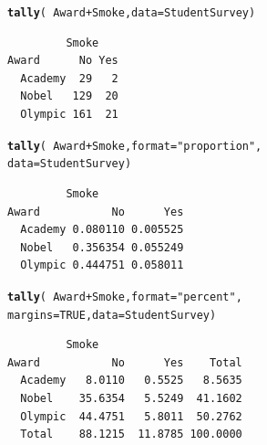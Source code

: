 \documentclass[10pt]{report}\usepackage[]{graphicx}\usepackage[]{xcolor}
\makeatletter
\newcommand{\hlnum}[1]{\textcolor[rgb]{0.686,0.059,0.569}{#1}}%
\newcommand{\hlsng}[1]{\textcolor[rgb]{0.192,0.494,0.8}{#1}}%
\newcommand{\hlopt}[1]{\textcolor[rgb]{0,0,0}{#1}}%
\newcommand{\hldef}[1]{\textcolor[rgb]{0.345,0.345,0.345}{#1}}%
\newcommand{\hlkwc}[1]{\textcolor[rgb]{0.333,0.667,0.333}{#1}}%
\newcommand{\hlkwd}[1]{\textcolor[rgb]{0.737,0.353,0.396}{\textbf{#1}}}%
\newenvironment{kframe}{%
 \def\at@end@of@kframe{}%
 \ifinner\ifhmode%
  \def\at@end@of@kframe{\end{minipage}}%
  \begin{minipage}{\columnwidth}%
 \fi\fi%
 \def\FrameCommand##1{\hskip\@totalleftmargin \hskip-\fboxsep
 \colorbox{shadecolor}{##1}\hskip-\fboxsep
     \hskip-\linewidth \hskip-\@totalleftmargin \hskip\columnwidth}%
 \MakeFramed {\advance\hsize-\width
   \@totalleftmargin\z@ \linewidth\hsize
   \@setminipage}}%
 {\par\unskip\endMakeFramed%
 \at@end@of@kframe}
\newenvironment{knitrout}{}{} %
\makeatother
\begin{document}
\begin{multicols}{3}
\begin{knitrout}\small
{}\color{fgcolor}\begin{kframe}
\begin{alltt}
\hlkwd{tally}\hldef{(}\hlopt{~} \hldef{Award} \hlopt{+} \hldef{Smoke ,} \hlkwc{data} \hldef{= StudentSurvey)}
\end{alltt}
\begin{verbatim}
         Smoke
Award      No Yes
  Academy  29   2
  Nobel   129  20
  Olympic 161  21
\end{verbatim}
\end{kframe}
\end{knitrout}
\vspace*{-.20in}
\begin{knitrout}\small
{}\color{fgcolor}\begin{kframe}
\begin{alltt}
\hlkwd{tally}\hldef{(}\hlopt{~} \hldef{Award} \hlopt{+} \hldef{Smoke ,} \hlkwc{format} \hldef{=} \hlsng{"proportion"}\hldef{,}
      \hlkwc{data} \hldef{= StudentSurvey)}
\end{alltt}
\begin{verbatim}
         Smoke
Award           No      Yes
  Academy 0.080110 0.005525
  Nobel   0.356354 0.055249
  Olympic 0.444751 0.058011
\end{verbatim}
\end{kframe}
\end{knitrout}
\vspace*{-.20in}
\begin{knitrout}\small
{}\color{fgcolor}\begin{kframe}
\begin{alltt}
\hlkwd{tally}\hldef{(}\hlopt{~} \hldef{Award} \hlopt{+} \hldef{Smoke ,} \hlkwc{format} \hldef{=} \hlsng{"percent"}\hldef{,}
      \hlkwc{margins} \hldef{=} \hlnum{TRUE}\hldef{,} \hlkwc{data} \hldef{= StudentSurvey)}
\end{alltt}
\begin{verbatim}
         Smoke
Award           No      Yes    Total
  Academy   8.0110   0.5525   8.5635
  Nobel    35.6354   5.5249  41.1602
  Olympic  44.4751   5.8011  50.2762
  Total    88.1215  11.8785 100.0000
\end{verbatim}
\end{kframe}
\end{knitrout}
\vspace*{-.20in}


\end{multicols}
\end{document}
